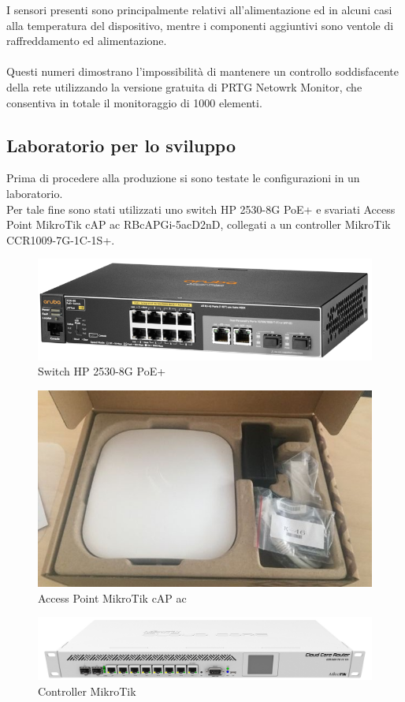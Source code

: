\documentclass[Realizzazione.tex]{subfiles}
\begin{document}
I sensori presenti sono principalmente relativi all'alimentazione ed in alcuni casi alla temperatura del dispositivo, mentre i componenti aggiuntivi sono ventole di raffreddamento ed alimentazione. \\\\
Questi numeri dimostrano l'impossibilità di mantenere un controllo soddisfacente della rete utilizzando la versione gratuita di PRTG Netowrk Monitor, che consentiva in totale il monitoraggio di 1000 elementi.

\subsection{Laboratorio per lo sviluppo}
Prima di procedere alla produzione si sono testate le configurazioni in un laboratorio. \\
Per tale fine sono stati utilizzati uno switch HP 2530-8G PoE+ e svariati Access Point MikroTik cAP ac RBcAPGi-5acD2nD, collegati a un controller MikroTik CCR1009-7G-1C-1S+.

\begin{figure}[H]
	\centering
	\includegraphics[width=0.6\linewidth]{"images/HP"}
	\caption{Switch HP 2530-8G PoE+}
	\label{fig:Switch HP 2530-8G PoE+}
\end{figure}
\begin{figure}[H]
	\centering
	\includegraphics[width=0.6\linewidth]{"images/AP"}
	\caption{Access Point MikroTik cAP ac}
	\label{fig:Access Point MikroTik cAP ac}
\end{figure}
\begin{figure}[H]
	\centering
	\includegraphics[width=0.6\linewidth]{"images/Router"}
	\caption{Controller MikroTik}
	\label{fig:Controller MikroTik}
\end{figure}
\end{document}
